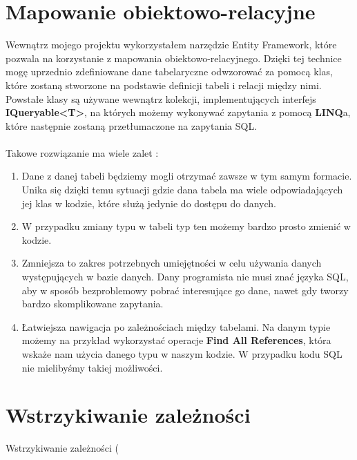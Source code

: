 \section{Mapowanie obiektowo-relacyjne}

Wewnątrz mojego projektu wykorzystałem narzędzie Entity Framework, które pozwala na korzystanie z mapowania obiektowo-relacyjnego. Dzięki tej technice mogę uprzednio zdefiniowane dane tabelaryczne odwzorować za pomocą klas, które zostaną stworzone na podstawie definicji tabeli i relacji między nimi. Powstałe klasy są używane wewnątrz kolekcji, implementujących interfejs \textbf{IQueryable<T>}, na których możemy wykonywać zapytania z pomocą \textbf{LINQ}a, które następnie zostaną przetłumaczone na zapytania SQL.
\\ \\
Takowe rozwiązanie ma wiele zalet :
\begin{enumerate}
	\item Dane z danej tabeli będziemy mogli otrzymać zawsze w tym samym formacie. Unika się dzięki temu sytuacji gdzie dana tabela ma wiele odpowiadających jej klas w kodzie, które służą jedynie do dostępu do danych.
	\item W przypadku zmiany typu w tabeli typ ten możemy bardzo prosto zmienić w kodzie.
	\item Zmniejsza to zakres potrzebnych umiejętności w celu używania danych występujących w bazie danych. Dany programista nie musi znać języka SQL, aby w sposób bezproblemowy pobrać interesujące go dane, nawet gdy tworzy bardzo skomplikowane zapytania.
	\item Łatwiejsza nawigacja po zależnościach między tabelami. Na danym typie możemy na przykład wykorzystać operacje \textbf{Find All References}, która wskaże nam użycia danego typu w naszym kodzie. W przypadku kodu SQL nie mielibyśmy takiej możliwości.
\end{enumerate}


\section{Wstrzykiwanie zależności}

Wstrzykiwanie zależności (%

